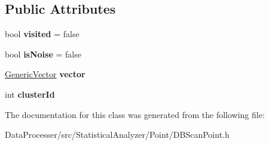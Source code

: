 \subsection*{Public Attributes}
\begin{DoxyCompactItemize}
\item 
\mbox{\label{classDBScanPoint_a461918457f165af35a5ba75b9bec7276}} 
bool {\bfseries visited} = false
\item 
\mbox{\label{classDBScanPoint_a3c7217821ce6d036cfb54a26b6e2bf0c}} 
bool {\bfseries is\+Noise} = false
\item 
\mbox{\label{classDBScanPoint_a474f0b933ad12fa225c780498b66f2c4}} 
\hyperlink{classGenericVector}{Generic\+Vector} {\bfseries vector}
\item 
\mbox{\label{classDBScanPoint_aa791e2035bf72a15e02eaa81b7fe2a4c}} 
int {\bfseries cluster\+Id}
\end{DoxyCompactItemize}


The documentation for this class was generated from the following file\+:\begin{DoxyCompactItemize}
\item 
Data\+Processer/src/\+Statistical\+Analyzer/\+Point/D\+B\+Scan\+Point.\+h\end{DoxyCompactItemize}
